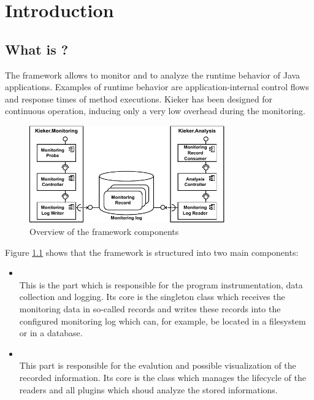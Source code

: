 \chapter{Introduction}
\section{What is \Kieker?}

The \Kieker{} framework allows to monitor and to analyze the runtime behavior %
of Java applications. Examples of runtime behavior are application-internal %
control flows and response times of method executions. %
Kieker has been designed for continuous operation, inducing only a very low %
overhead during the monitoring. 

\begin{figure}[H]\centering
\includegraphics[width=0.75\textwidth]{images/kiekerComponentDiagram-woCloud-bw-w-record-newNames}
\caption{Overview of the framework components}
\label{Figure:KiekerComponentDiagram}
\end{figure}
		
\noindent Figure \ref{Figure:KiekerComponentDiagram} shows that the framework %
is structured into two main components:%
\begin{itemize}
\item \KiekerMonitoringPart\\
This is the part which is responsible for the program instrumentation, data %
collection and logging.  Its core is the singleton class  %
\notify which receives the monitoring data in so-called records and %
writes these records into the configured monitoring log which can, for example, %
be located in a filesystem or in a database.
\item \KiekerAnalysisPart\\
This part is responsible for the evalution and possible visualization of the %
recorded information. Its core is the class  \notify %
which manages the lifecycle of the readers and all plugins which shoud analyze %
the stored informations.
\end{itemize}

